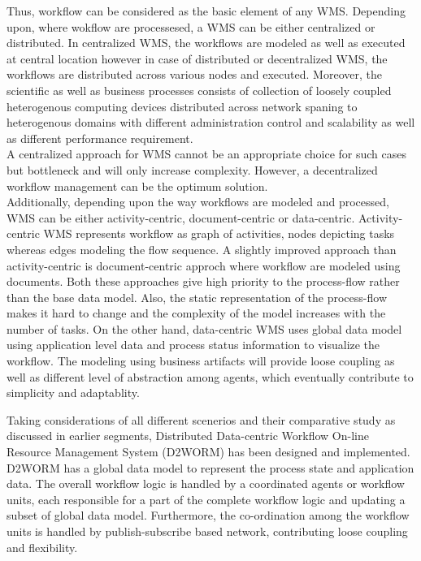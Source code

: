 Thus, workflow can be considered as the basic element of any \acrshort{WMS}. Depending upon, where wokflow are processesed, a \acrshort{WMS} can be either centralized or distributed. In centralized \acrshort{WMS}, the workflows are modeled as well as executed at central location however in case of distributed or decentralized \acrshort{WMS}, the workflows are distributed across various nodes and executed.\cite{Lee:2000aa} Moreover, the scientific as well as business processes consists of collection of loosely coupled heterogenous computing devices distributed across network spaning to heterogenous domains with different administration control and scalability as well as different performance requirement. \cite{Schneider:2015aa, Alonso:2015aa}
\\

A centralized approach for \acrshort{WMS} cannot be an appropriate choice for such cases but bottleneck and will only increase complexity. \cite{Dogac:2015aa}However, a decentralized workflow management can be the optimum solution. \cite{Alonso:2015aa}
\\

Additionally, depending upon the way workflows are modeled and processed, \acrshort{WMS} can be either activity-centric, document-centric or data-centric. Activity-centric \acrshort{WMS} represents workflow as graph of activities, nodes depicting tasks whereas edges modeling the flow sequence. A slightly improved approach than activity-centric is document-centric approch where workflow are modeled using documents. Both these approaches give high priority to the process-flow rather than the base data model. Also, the static representation of the process-flow makes it hard to change and the complexity of the model increases with the number of tasks. On the other hand, data-centric \acrshort{WMS} uses global data model using application level data and process status information to visualize the workflow. The modeling using business artifacts will provide loose coupling as well as different level of abstraction among agents, which eventually contribute to simplicity and adaptablity.\cite{Jergler:2015aa, Cohn:2015aa}

Taking considerations of all different scenerios and their comparative study as discussed in earlier segments, Distributed Data-centric Workflow On-line Resource Management System (\acrshort{D2WORM}) has been designed and implemented. \acrshort{D2WORM} has a global data model to represent the process state and application data. The overall workflow logic is handled by a coordinated agents or workflow units, each responsible for a part of the complete workflow logic and updating a subset of global data model. Furthermore, the co-ordination among the workflow units is handled by publish-subscribe based network, contributing loose coupling and flexibility.\cite{Jergler:2015aa}
\\


